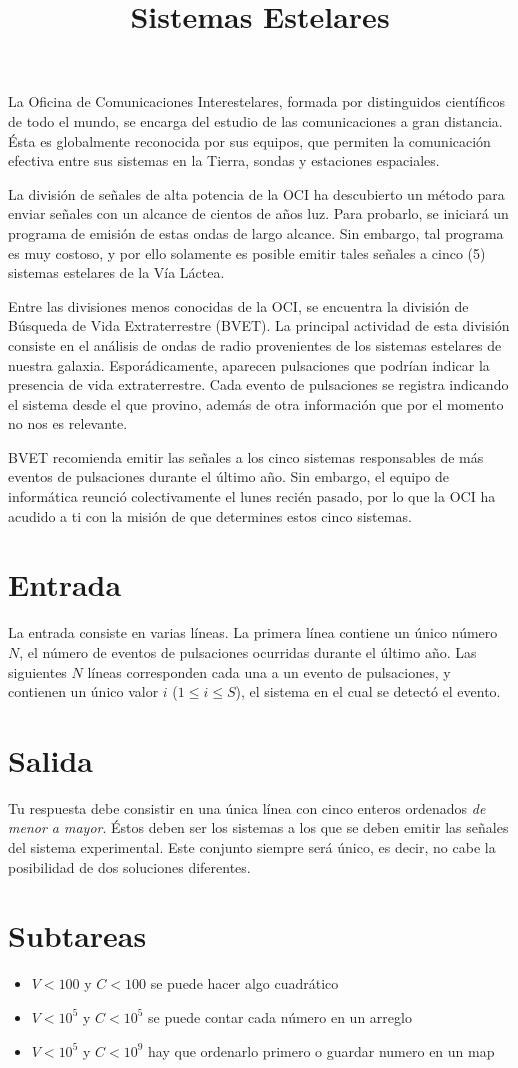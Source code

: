 \documentclass{article}
\title{Sistemas Estelares}
\begin{document}
\maketitle

La Oficina de Comunicaciones Interestelares, formada por distinguidos científicos de todo el mundo, se encarga del estudio de las comunicaciones a gran distancia.
Ésta es globalmente reconocida por sus equipos, que permiten la comunicación efectiva entre sus sistemas en la Tierra, sondas y estaciones espaciales.

La división de señales de alta potencia de la OCI ha descubierto un método para enviar señales con un alcance de cientos de años luz.
Para probarlo, se iniciará un programa de emisión de estas ondas de largo alcance.
Sin embargo, tal programa es muy costoso, y por ello solamente es posible emitir tales señales a cinco (5) sistemas estelares de la Vía Láctea.

Entre las divisiones menos conocidas de la OCI, se encuentra la división de Búsqueda de Vida Extraterrestre (BVET).
La principal actividad de esta división consiste en el análisis de ondas de radio provenientes de los sistemas estelares de nuestra galaxia.
Esporádicamente, aparecen pulsaciones que podrían indicar la presencia de vida extraterrestre.
Cada evento de pulsaciones se registra indicando el sistema desde el que provino, además de otra información que por el momento no nos es relevante.

BVET recomienda emitir las señales a los cinco sistemas responsables de más eventos de pulsaciones durante el último año.
Sin embargo, el equipo de informática reunció colectivamente el lunes recién pasado, por lo que la OCI ha acudido a ti con la misión de que determines estos cinco sistemas.

\section*{Entrada}
La entrada consiste en varias líneas.
La primera línea contiene un único número $N$, el número de eventos de pulsaciones ocurridas durante el último año.
Las siguientes $N$ líneas corresponden cada una a un evento de pulsaciones, y contienen un único valor $i$ ($1 \le i \le S$), el sistema en el cual se detectó el evento.

\section*{Salida}
Tu respuesta debe consistir en una única línea con cinco enteros ordenados \emph{de menor a mayor}.
Éstos deben ser los sistemas a los que se deben emitir las señales del sistema experimental.
Este conjunto siempre será único, es decir, no cabe la posibilidad de dos soluciones diferentes.

\section*{Subtareas}
\begin{itemize}
  \item $V < 100$ y $C<100$ se puede hacer algo cuadrático
  \item $V < 10^5$ y $C<10^5$ se puede contar cada número en un arreglo
  \item $V < 10^5$ y $C<10^9$ hay que ordenarlo primero o guardar numero en un map
\end{itemize}
\end{document}
